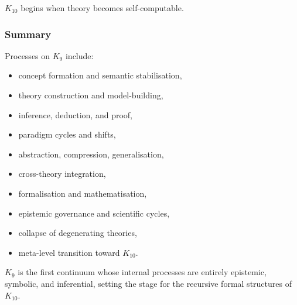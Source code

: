 $K_{10}$ begins when theory becomes self-computable.

\subsubsection{Summary}

Processes on $K_9$ include:
\begin{itemize}
    \item concept formation and semantic stabilisation,
    \item theory construction and model-building,
    \item inference, deduction, and proof,
    \item paradigm cycles and shifts,
    \item abstraction, compression, generalisation,
    \item cross-theory integration,
    \item formalisation and mathematisation,
    \item epistemic governance and scientific cycles,
    \item collapse of degenerating theories,
    \item meta-level transition toward $K_{10}$.
\end{itemize}

$K_9$ is the first continuum whose internal processes are entirely 
epistemic, symbolic, and inferential, setting the stage for the 
recursive formal structures of $K_{10}$.
